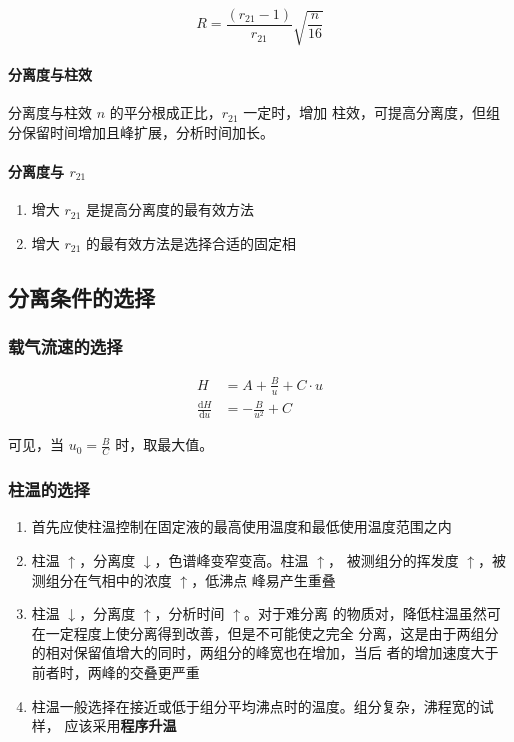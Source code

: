 \begin{equation}
    R = \frac{(r_{21} - 1)}{r_{21}} \sqrt{\frac{n}{16}}
\end{equation}

\paragraph{分离度与柱效} 分离度与柱效 $n$ 的平分根成正比，$r_{21}$ 一定时，增加
柱效，可提高分离度，但组分保留时间增加且峰扩展，分析时间加长。

\paragraph{分离度与 $r_{21}$}

\begin{enumerate}
    \item 增大 $r_{21}$ 是提高分离度的最有效方法
    \item 增大 $r_{21}$ 的最有效方法是选择合适的固定相
\end{enumerate}

\subsection{分离条件的选择}

\subsubsection{载气流速的选择}

\begin{align}
    H                               & = A + \frac{B}{u} + C \cdot u \\
    \frac{\mathrm d H}{\mathrm d u} & = - \frac{B}{u^2} + C
\end{align}

可见，当 $ u_0 = \frac{B}{C} $ 时，取最大值。

\subsubsection{柱温的选择}

\begin{enumerate}
    \item 首先应使柱温控制在固定液的最高使用温度和最低使用温度范围之内
    \item 柱温 $\uparrow$，分离度 $\downarrow$，色谱峰变窄变高。柱温 $\uparrow$，
          被测组分的挥发度 $\uparrow$，被测组分在气相中的浓度 $\uparrow$，低沸点
          峰易产生重叠
    \item 柱温 $\downarrow$，分离度 $\uparrow$，分析时间 $\uparrow$。对于难分离
          的物质对，降低柱温虽然可在一定程度上使分离得到改善，但是不可能使之完全
          分离，这是由于两组分的相对保留值增大的同时，两组分的峰宽也在增加，当后
          者的增加速度大于前者时，两峰的交叠更严重
    \item 柱温一般选择在接近或低于组分平均沸点时的温度。组分复杂，沸程宽的试样，
          应该采用\textbf{程序升温}
\end{enumerate}

